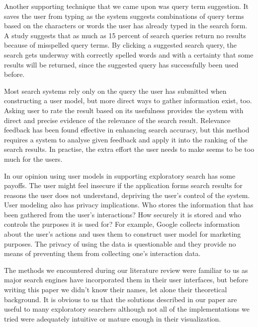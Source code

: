 Another supporting technique that we came upon was query term suggestion.
It saves the user from typing as the system suggests combinations of query terms based on the characters or words the user has already typed in the search form.
A study suggests that as much as 15 percent of search queries return no results because of misspelled query terms.
By clicking a suggested search query, the search gets underway with correctly spelled words and with a certainty that some results will be returned, since the suggested query has successfully been used before.

Most search systems rely only on the query the user has submitted when constructing a user model, but more direct ways to gather information exist, too.
Asking user to rate the result based on its usefulness provides the system with direct and precise evidence of the relevance of the search result.
Relevance feedback has been found effective in enhancing search accuracy, but this method requires a system to analyse given feedback and apply it into the ranking of the search results.
In practise, the extra effort the user needs to make seems to be too much for the users.

In our opinion using user models in supporting exploratory search has some payoffs. The user might feel insecure if the application forms search results for reasons the user does not understand, depriving the user's control of the system. User modeling also has privacy implications. Who stores the information that has been gathered from the user's interactions? How securely it is stored and who controls the purposes it is used for? For example, Google collects information about the user's actions and uses them to construct user model for marketing purposes. The privacy of using the data is questionable and they provide no means of preventing them from collecting one's interaction data. 

The methods we encountered during our literature review were familiar to us as major search engines have incorporated them in their user interfaces, but before writing this paper we didn't know their names, let alone their theoretical background. It is obvious to us that the solutions described in our paper are useful to many exploratory searchers although not all of the implementations we tried were adequately intuitive or mature enough in their visualization.

